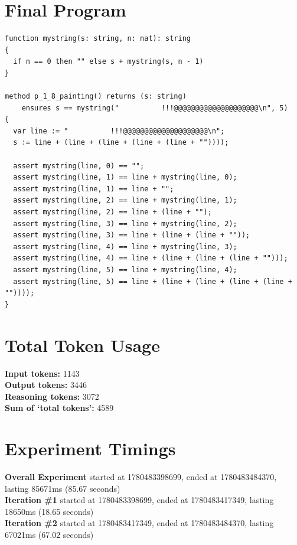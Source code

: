 \documentclass{article}
\begin{document}
\section*{Final Program}
\begin{lstlisting}
function mystring(s: string, n: nat): string
{
  if n == 0 then "" else s + mystring(s, n - 1)
}

method p_1_8_painting() returns (s: string)
	ensures s == mystring("          !!!@@@@@@@@@@@@@@@@@@@@\n", 5)
{
  var line := "          !!!@@@@@@@@@@@@@@@@@@@@\n";
  s := line + (line + (line + (line + (line + ""))));

  assert mystring(line, 0) == "";
  assert mystring(line, 1) == line + mystring(line, 0);
  assert mystring(line, 1) == line + "";
  assert mystring(line, 2) == line + mystring(line, 1);
  assert mystring(line, 2) == line + (line + "");
  assert mystring(line, 3) == line + mystring(line, 2);
  assert mystring(line, 3) == line + (line + (line + ""));
  assert mystring(line, 4) == line + mystring(line, 3);
  assert mystring(line, 4) == line + (line + (line + (line + "")));
  assert mystring(line, 5) == line + mystring(line, 4);
  assert mystring(line, 5) == line + (line + (line + (line + (line + ""))));
}
\end{lstlisting}
\section*{Total Token Usage}
\textbf{Input tokens: }1143
\\\textbf{Output tokens: }3446
\\\textbf{Reasoning tokens: }3072
\\\textbf{Sum of `total tokens': }4589
\section*{Experiment Timings}
\textbf{Overall Experiment} started at 1780483398699, ended at 1780483484370, lasting 85671ms (85.67 seconds)
\\\textbf{Iteration \#1} started at 1780483398699, ended at 1780483417349, lasting 18650ms (18.65 seconds)
\\\textbf{Iteration \#2} started at 1780483417349, ended at 1780483484370, lasting 67021ms (67.02 seconds)
\end{document}
